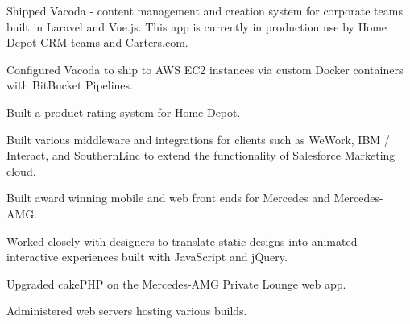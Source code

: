 \documentclass[]{pb-resume}
\begin{document}
\begin{minipage}[t]{0.66\textwidth}
\begin{tightemize}
\item Shipped Vacoda - content management and creation system for corporate teams built in Laravel and Vue.js. This app is currently in production use by Home Depot CRM teams and Carters.com.
\item Configured Vacoda to ship to AWS EC2 instances via custom Docker containers with BitBucket Pipelines.
\item Built a product rating system for Home Depot.
\item Built various middleware and integrations for clients such as WeWork, IBM / Interact, and SouthernLinc to extend the functionality of Salesforce Marketing cloud.
\end{tightemize}  
\sectionsep

\vspace{\topsep} %
\begin{tightemize}
\item Built award winning mobile and web front ends for Mercedes and Mercedes-AMG.
\item Worked closely with designers to translate static designs into animated interactive experiences built with JavaScript and jQuery.
\item Upgraded cakePHP on the Mercedes-AMG Private Lounge web app. 
\item Administered web servers hosting various builds.
\end{tightemize}
\sectionsep

\end{minipage} 
\end{document}
